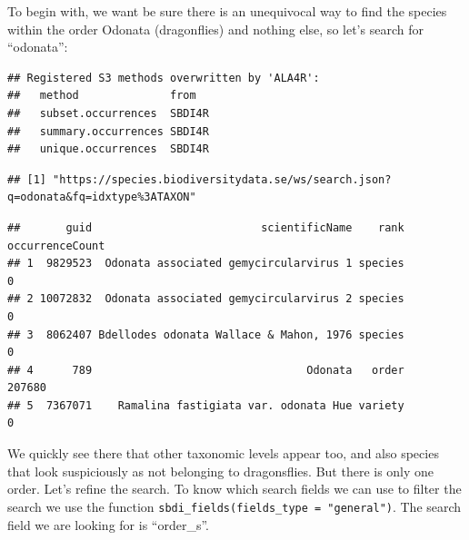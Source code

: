 \documentclass[
  10pt,
]{article}
\newenvironment{Shaded}{\begin{snugshade}}{\end{snugshade}}
\newcommand{\AttributeTok}[1]{\textcolor[rgb]{0.77,0.63,0.00}{#1}}
\newcommand{\DecValTok}[1]{\textcolor[rgb]{0.00,0.00,0.81}{#1}}
\newcommand{\FunctionTok}[1]{\textcolor[rgb]{0.00,0.00,0.00}{#1}}
\newcommand{\NormalTok}[1]{#1}
\newcommand{\OtherTok}[1]{\textcolor[rgb]{0.56,0.35,0.01}{#1}}
\newcommand{\SpecialCharTok}[1]{\textcolor[rgb]{0.00,0.00,0.00}{#1}}
\newcommand{\StringTok}[1]{\textcolor[rgb]{0.31,0.60,0.02}{#1}}
\begin{document}
To begin with, we want be sure there is an unequivocal way to find the species within
the order Odonata (dragonflies) and nothing else, so let's search for ``odonata'':

\begin{Shaded}
\end{Shaded}

\begin{verbatim}
## Registered S3 methods overwritten by 'ALA4R':
##   method              from  
##   subset.occurrences  SBDI4R
##   summary.occurrences SBDI4R
##   unique.occurrences  SBDI4R
\end{verbatim}

\begin{verbatim}
## [1] "https://species.biodiversitydata.se/ws/search.json?q=odonata&fq=idxtype%3ATAXON"
\end{verbatim}

\begin{verbatim}
##       guid                          scientificName    rank occurrenceCount
## 1  9829523  Odonata associated gemycircularvirus 1 species               0
## 2 10072832  Odonata associated gemycircularvirus 2 species               0
## 3  8062407 Bdellodes odonata Wallace & Mahon, 1976 species               0
## 4      789                                 Odonata   order          207680
## 5  7367071    Ramalina fastigiata var. odonata Hue variety               0
\end{verbatim}

We quickly see there that other taxonomic levels appear too, and also species that look suspiciously as not belonging to
dragonsflies. But there is only one order. Let's refine the search. To know which search fields we can use
to filter the search we use the function \texttt{sbdi\_fields(fields\_type\ =\ "general")}.
The search field we are looking for is ``order\_s''.

\begin{Shaded}
\end{Shaded}
\end{document}
